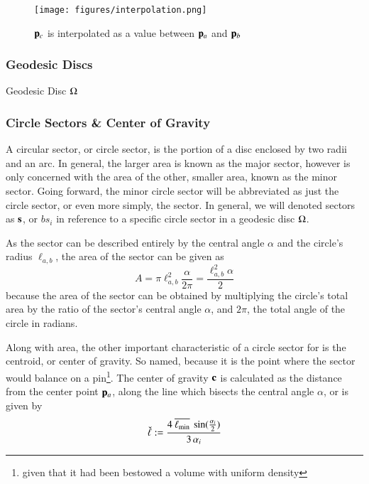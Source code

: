 \begin{figure}
\ffigbox
	{\texttt{[image: figures/interpolation.png]}}
	{\caption[Interpolation between two points in $\mathbb{R}^2$]{$\mathbf{p}_c$ is interpolated as a value between $\mathbf{p}_a$ and $\mathbf{p}_b$}\label{fig:interpolation}}
\end{figure}

%
\subsubsection{Geodesic Discs}
Geodesic Disc $\Omega$%
%
%

%
\subsubsection{Circle Sectors \& Center of Gravity}
A circular sector, or circle sector, is the portion of a disc enclosed by two radii and an arc. In general, the larger area is known as the major sector, however  is only concerned with the area of the other, smaller area, known as the minor sector. Going forward, the minor circle sector will be abbreviated as just the circle sector, or even more simply, the sector. In general, we will denoted sectors as $\mathbf{s}$, or $bs_i$ in reference to a specific circle sector in a geodesic disc $\Omega$.%
%
%
%

As the sector can be described entirely by the central angle $\alpha$ and the circle's radius $\ell_{a,b}$, the area of the sector can be given as
%
\begin{equation}
	A = \pi \ell_{a,b}^2\frac{\alpha}{2\pi} = \frac{\ell_{a,b}^2\alpha}{2}
	\label{eq:areaOfCircleSector}
\end{equation}
%
because the area of the sector can be obtained by multiplying the circle's total area by the ratio of the sector's central angle $\alpha$, and $2\pi$, the total angle of the circle in radians.~\cite{Weisstein19d}%
%

Along with area, the other important characteristic of a circle sector for  is the centroid, or center of gravity. So named, because it is the point where the sector would balance on a pin\footnote{given that it had been bestowed a volume with uniform density}. The center of gravity $\mathbf{c}$ is calculated as the distance from the center point $\mathbf{p}_a$, along the line which bisects the central angle $\alpha$, or is given by
%
\begin{equation}
	\check{\ell} := \frac{4\:\overline{\ell_\text{min}}\:\sin(\frac{\alpha_i}{2})}{3\,\alpha_i}
	\label{eq:ch2distToCoG}
\end{equation}%
%

